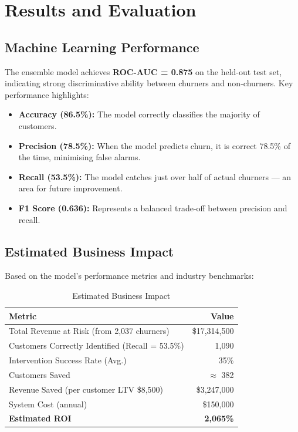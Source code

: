 \documentclass[12pt, a4paper]{report}
\begin{document}
\chapter{Results and Evaluation}

\section{Machine Learning Performance}

The ensemble model achieves \textbf{ROC-AUC = 0.875} on the held-out test set, indicating strong discriminative ability between churners and non-churners. Key performance highlights:

\begin{itemize}
    \item \textbf{Accuracy (86.5\%):} The model correctly classifies the majority of customers.
    \item \textbf{Precision (78.5\%):} When the model predicts churn, it is correct 78.5\% of the time, minimising false alarms.
    \item \textbf{Recall (53.5\%):} The model catches just over half of actual churners --- an area for future improvement.
    \item \textbf{F1 Score (0.636):} Represents a balanced trade-off between precision and recall.
\end{itemize}

\section{Estimated Business Impact}

Based on the model's performance metrics and industry benchmarks:

\begin{table}[H]
\centering
\caption{Estimated Business Impact}
\label{tab:impact}
\begin{tabular}{l r}
\toprule
\textbf{Metric} & \textbf{Value} \\
\midrule
Total Revenue at Risk (from 2,037 churners) & \$17,314,500 \\
Customers Correctly Identified (Recall = 53.5\%) & 1,090 \\
Intervention Success Rate (Avg.) & 35\% \\
Customers Saved & $\approx$ 382 \\
Revenue Saved (per customer LTV \$8,500) & \$3,247,000 \\
System Cost (annual) & \$150,000 \\
\textbf{Estimated ROI} & \textbf{2,065\%} \\
\bottomrule
\end{tabular}
\end{table}
\end{document}
